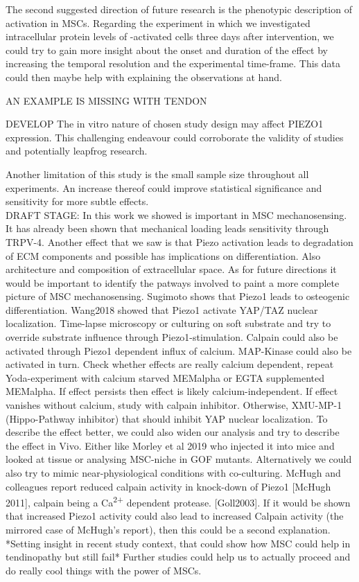The second suggested direction of future research is the phenotypic description of \Piezo{} activation in MSCs. Regarding the experiment in which we investigated intracellular protein levels of \Piezo{}-activated cells three days after intervention, we could try to gain more insight about the onset and duration of the effect by increasing the temporal resolution and the experimental time-frame. This data could then maybe help with explaining the observations at hand.

AN EXAMPLE IS MISSING WITH TENDON

 
DEVELOP The in vitro nature of chosen study design may affect PIEZO1 expression.  This challenging endeavour could corroborate the validity of \Yoda{} studies and potentially leapfrog \Piezo{} research.

Another limitation of this study is the small sample size throughout all experiments. An increase thereof could improve statistical significance and sensitivity for more subtle effects.\\



DRAFT STAGE: 
In this work we showed \Piezo{} is important in MSC mechanosensing. It has already been shown that mechanical loading leads sensitivity through TRPV-4.  Another effect that we saw is that Piezo activation leads to degradation of ECM components and possible has implications on differentiation. Also architecture and composition of extracellular space.
As for future directions it would be important to identify the patways involved to paint a more complete picture of MSC mechanosensing. Sugimoto shows that Piezo1 leads to osteogenic differentiation. Wang2018 showed that Piezo1 activate YAP/TAZ nuclear localization. Time-lapse microscopy or culturing on soft substrate and try to override substrate influence through Piezo1-stimulation. Calpain could also be activated through Piezo1 dependent influx of calcium. MAP-Kinase could also be activated in turn.  Check whether effects are really calcium dependent, repeat Yoda-experiment with calcium starved MEMalpha or EGTA supplemented MEMalpha. If effect persists then effect is likely calcium-independent. If effect vanishes without calcium, study with calpain inhibitor. Otherwise, XMU-MP-1 (Hippo-Pathway inhibitor) that should inhibit YAP nuclear localization. To describe the effect better, we could also widen our analysis and try to describe the effect in Vivo. Either like Morley et al 2019 who injected it into mice and looked at tissue or analysing MSC-niche in GOF mutants. Alternatively we could also try to mimic near-physiological conditions with co-culturing.
McHugh and colleagues report reduced calpain activity in knock-down of Piezo1 [McHugh 2011], calpain being a Ca\textsuperscript{2+} dependent protease. [Goll2003]. If it would be shown that increased Piezo1 activity could also lead to increased Calpain activity (the mirrored case of McHugh's report), then this could be a second explanation.
*Setting insight in recent study context, that could show how MSC could help in tendinopathy but still fail* Further studies could help us to actually proceed and do really cool things with the power of MSCs. 